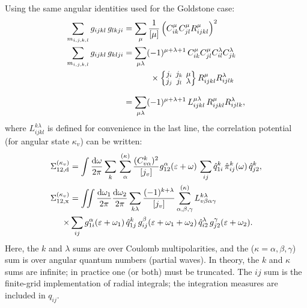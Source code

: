 \documentclass[10pt,twocolumn,a4paper]{article}%
\newcommand{\sixj}[6]{\renewcommand\arraystretch{0.75}\setlength\arraycolsep{2pt}\small\ensuremath{\begin{Bmatrix}#1&#2&#3\\#4&#5&#6\end{Bmatrix}}}	%
\def\d{\ensuremath{{\rm d}}}
\def\en{\ensuremath{\varepsilon}}
\renewcommand{\a}{\ensuremath{\alpha}}
\renewcommand{\b}{\ensuremath{\beta}}
\newcommand{\g}{\ensuremath{\gamma}}
\renewcommand{\k}{\ensuremath{\kappa}}
\newcommand{\w}{\ensuremath{\omega}}
\begin{document}
Using the same angular identities used for the Goldstone case:
\begin{align}
\sum_{m_{i,j,k,l}}  g_{ijkl} \, g_{lkji}
    &= \sum_\mu \frac{1}{[\mu]} \left( C^\mu_{ik}C^\mu_{jl} R^\mu_{ijkl}\right)^2 \\
\sum_{m_{i,j,k,l}}  g_{ijkl} \, g_{klji}
        &=\sum_{\mu \lambda}(-1)^{\mu+\lambda+1}\, C^\mu_{ik}C^\mu_{jl}C^\lambda_{il}C^\lambda_{jk} \notag \\
    &\phantom{=\sum_{\mu \lambda}}~~\times \sixj{j_i}{j_k}{\mu}{j_j}{j_l}{\lambda}R^\mu_{ijkl}R^\lambda_{ijlk}\\
            &=\sum_{\mu \lambda}(-1)^{\mu+\lambda+1} \, L^{\mu\lambda}_{ijkl} \, R^\mu_{ijkl}R^\lambda_{ijlk},
\end{align}
where $L^{k\lambda}_{ijkl}$ is defined for convenience in the last line,
the correlation potential (for angular state $\k_v$) can be written:
\begin{align}
\Sigma^{(\k_v)}_{12,{\rm d}}
&= \int\frac{\d \w}{2\pi} \sum_k\,\sum_{\alpha}^{(\kappa)} \frac{ (C^k_{v\a})^2}{[j_v]}
g^{\alpha}_{12}(\en+\w) \, \sum_{ij} \hat q^k_{1i} \, \hat \pi_{ij}^{k}(\w) \, \hat q^k_{j2},
\label{eq:RadialSigmaDir}
\\
\Sigma^{(\k_v)}_{12,{\rm x}}
&= \iint\frac{\d\w_1}{2\pi} \frac{\d\w_2}{2\pi} \sum_{k\lambda}\frac{(-1)^{k+\lambda}}{[j_v]}
\sum^{(\k)}_{\a,\b,\g} 
L_{v\b\a\g}^{k\lambda}
\notag\\
\times&\sum_{ij}  g^\a_{1i}(\en+\w_1)\,\hat q^k_{1j}\,g^\b_{ij}(\en+\w_1+\w_2)\,\hat q^\lambda_{i2}\,g^\g_{j2}(\en+\w_2).
\label{eq:RadialSigmaExch}
\end{align}
Here, the $k$ and $\lambda$ sums are over Coulomb multipolarities, and the ($\k=\a,\b,\g$) sum is over angular quantum numbers (partial waves).
In theory, the $k$ and $\kappa$ sums are infinite; in practice one (or both) must be truncated.
The $ij$ sum is the finite-grid implementation of radial integrals; the integration measures are included in $q_{ij}$.
\end{document}
